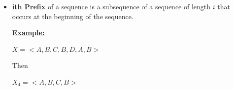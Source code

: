 \documentclass[12pt]{article}
\begin{document}
\begin{enumerate}[1.]
    \bigskip

    \begin{itemize}
        \item \textbf{ith Prefix} of a sequence is a subsequence of a sequence of length $i$ that occurs at the beginning of the sequence.

        \bigskip

        \underline{\textbf{Example:}}

        \bigskip

        $X = <A,B,C,B,D,A,B>$

        \bigskip

        Then

        \bigskip

        $X_4 = <A,B,C,B>$
    \end{itemize}
\end{enumerate}
\end{document}
